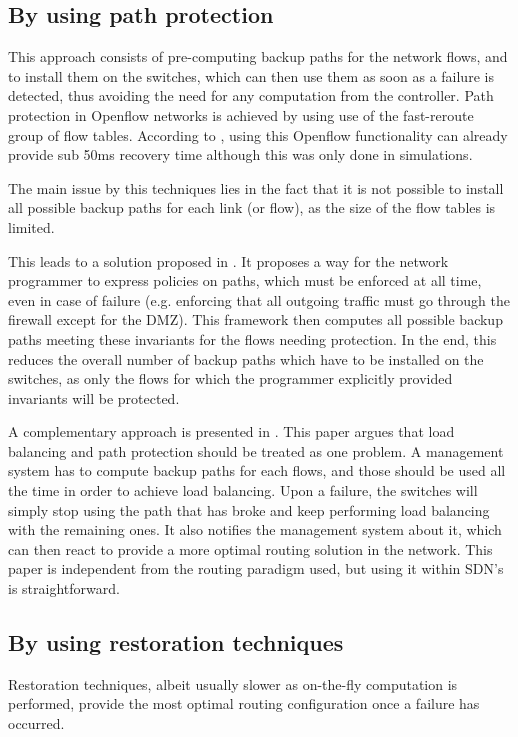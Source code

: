 \documentclass[final]{IEEEtran}
\begin{document}
\subsection{By using path protection}
This approach consists of pre-computing backup paths for the network flows, and to install them on the switches, which can then use them as soon as a failure is detected, thus avoiding the need for any computation from the controller. Path protection in Openflow networks is achieved by using use of the fast-reroute group of flow tables. According to \cite{Sharma:2013:OMC:2445634.2445903}, using this Openflow functionality can already provide sub 50ms recovery time although this was only done in simulations.

The main issue by this techniques lies in the fact that it is not possible to install all possible backup paths for each link (or flow), as the size of the flow tables is limited.

This leads to a solution proposed in \cite{Reitblatt:2013:FDF:2491185.2491187}. It proposes a way for the network programmer to express policies on paths, which must be enforced at all time, even in case of failure (e.g. enforcing that all outgoing traffic must go through the firewall except for the DMZ). This framework then computes all possible backup paths meeting these invariants for the flows needing protection. In the end, this reduces the overall number of backup paths which have to be installed on the switches, as only the flows for which the programmer explicitly provided invariants will be protected.

A complementary approach is presented in \cite{Suchara:2011:NAJ:1993744.1993756}. This paper argues that load balancing and path protection should be treated as one problem. A management system has to compute backup paths for each flows, and those should be used all the time in order to achieve load balancing. Upon a failure, the switches will simply stop using the path that has broke and keep performing load balancing with the remaining ones. It also notifies the management system about it, which can then react to provide a more optimal routing solution in the network. This paper is independent from the routing paradigm used, but using it within SDN's is straightforward.

\subsection{By using restoration techniques}
Restoration techniques, albeit usually slower as on-the-fly computation is performed, provide the most optimal routing configuration once a failure has occurred.
\end{document}
